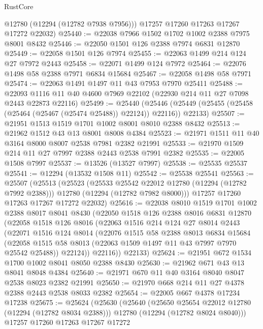 \begin{lexlean}{RustCore}
\begin{coremodule}
        @12780
        (@12294 (@12782 @7938 @7956)))
      @17257
      @17260
      @17263
      @17267
      @17272
      @22032)
@25440 := @22038 @7966 @1502 @1702 @1002 @2388 @7975 @8001 @8432
@25446 := @22050 @1501 @126 @2388 @7974 @6831 @12870
@25449 := @22058 @1501 @126 @7974
@25455 := @22063 @1499 @214 @124 @27 @7972 @2443
@25458 := @22071 @1499 @124 @7972
@25464 := @22076 @1498 @58 @2388 @7971 @6834 @15684
@25467 := @22058 @1498 @58 @7971
@25474 := @22063 @1491 @1497 @11 @43 @7953 @7970 @25411
@25488 := @22093 @1116 @11 @40 @4600 @7969 @22102 (@22930 @214 @11 @27 @7098 @2443 @22873 @22116)
@25499 := @25440
    (@25446 (@25449 (@25455 (@25458 (@25464 (@25467 (@25474 @25488)) @22124)) @22116)) @22133)
@25507 := @21951 @1513 @1519 @1701 @1002 @8001 @8010 @2388 @8432
@25513 := @21962 @1512 @43 @13 @8001 @8008 @4384
@25523 := @21971 @1511 @11 @40 @3164 @8000 @8007 @2538 @7981 @2382 @21991
@25533 := @21970 @1509 @214 @11 @27 @7997 @2388 @2443 @2538 @7991 @2382
@25535 := @22005 @1508 @7997
@25537 := @13526 (@13527 @7997)
@25538 := @25535 @25537
@25541 := @12294 (@13532 @1508 @11)
@25542 := @25538 @25541
@25563 := @25507
    (@25513
      (@25523
        (@25533 @25542 @22012 @12780 (@12294 (@12782 @7992 @2388)))
        @12780
        (@12294 (@12782 @7982 @8000)))
      @17257
      @17260
      @17263
      @17267
      @17272
      @22032)
@25616 := @22038
    @8010
    @1519
    @1701
    @1002
    @2388
    @8017
    @8041
    @8430
    (@22050
      @1518
      @126
      @2388
      @8016
      @6831
      @12870
      (@22058
        @1518
        @126
        @8016
        (@22063
          @1516
          @214
          @124
          @27
          @8014
          @2443
          (@22071
            @1516
            @124
            @8014
            (@22076
              @1515
              @58
              @2388
              @8013
              @6834
              @15684
              (@22058 @1515 @58 @8013 (@22063 @1509 @1497 @11 @43 @7997 @7970 @25542 @25488))
              @22124))
          @22116))
      @22133)
@25624 := @21951 @672 @1534 @1700 @1002 @8041 @8050 @2388 @8430
@25630 := @21962 @671 @43 @13 @8041 @8048 @4384
@25640 := @21971 @670 @11 @40 @3164 @8040 @8047 @2538 @8023 @2382 @21991
@25650 := @21970 @668 @214 @11 @27 @4378 @2388 @2443 @2538 @8033 @2382
@25654 := @22005 @667 @4378 @17234 @17238
@25675 := @25624
    (@25630
      (@25640
        (@25650 @25654 @22012 @12780 (@12294 (@12782 @8034 @2388)))
        @12780
        (@12294 (@12782 @8024 @8040)))
      @17257
      @17260
      @17263
      @17267
      @17272

\end{coremodule}
\end{lexlean}
